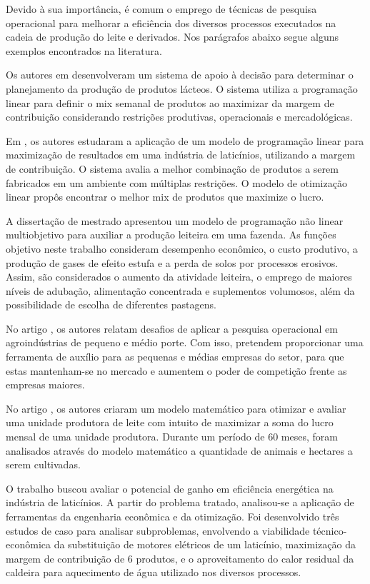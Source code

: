 \documentclass [11pt]{articleSBPO}
\begin{document}
Devido à sua importância, é comum o emprego de técnicas de pesquisa operacional para melhorar a eficiência dos diversos processos executados na cadeia de produção do leite e derivados. Nos parágrafos abaixo segue alguns exemplos encontrados na literatura. 

Os autores em \cite{junior2005} desenvolveram um sistema de apoio à decisão para determinar o planejamento da produção de produtos lácteos. O sistema utiliza a programação linear para definir o mix semanal de produtos ao maximizar da margem de contribuição considerando 
restrições produtivas, operacionais e mercadológicas.

Em \cite{miranda2007uso}, os autores estudaram a aplicação de um modelo de programação linear para maximização de resultados em uma indústria de laticínios, utilizando a margem de contribuição. O sistema avalia a melhor combinação de produtos a serem fabricados em um ambiente com múltiplas restrições. O modelo de otimização linear propôs encontrar o melhor mix de produtos que maximize o lucro. 

A dissertação de mestrado \cite{faoro2009} apresentou um modelo de programação não linear multiobjetivo para auxiliar a produção leiteira em uma fazenda. As funções objetivo neste trabalho consideram desempenho econômico, o custo produtivo, a produção de gases de efeito estufa e a perda de solos por processos erosivos. Assim, são considerados o aumento da atividade leiteira, o emprego de maiores níveis de adubação, alimentação concentrada e suplementos volumosos, além da possibilidade de escolha de diferentes pastagens.

No artigo \cite{oliszeski2009}, os autores relatam desafios de aplicar a pesquisa operacional em agroindústrias de pequeno e médio porte. Com isso, pretendem proporcionar uma ferramenta de auxílio para as pequenas e médias empresas do setor, para que estas mantenham-se no mercado e aumentem o poder de competição frente as empresas maiores.

No artigo \cite{gameiro2011}, os autores criaram um modelo matemático para otimizar e avaliar uma unidade produtora de leite com intuito de maximizar a soma do lucro mensal de uma unidade produtora. Durante um período de $ 60 $ meses, foram analisados através do modelo matemático a quantidade de animais e hectares a serem cultivadas.

O trabalho \cite{kawano2012otimizaccao} buscou avaliar o potencial de ganho em eficiência energética na indústria de laticínios. A partir do problema tratado, analisou-se a aplicação de ferramentas da engenharia econômica e da otimização. Foi desenvolvido três estudos de caso para analisar subproblemas, envolvendo a viabilidade técnico-econômica da substituição de motores elétricos de um laticínio, maximização da margem de contribuição de $ 6 $ produtos, e o aproveitamento do calor residual da caldeira para aquecimento de água utilizado nos diversos processos.
\end{document}

